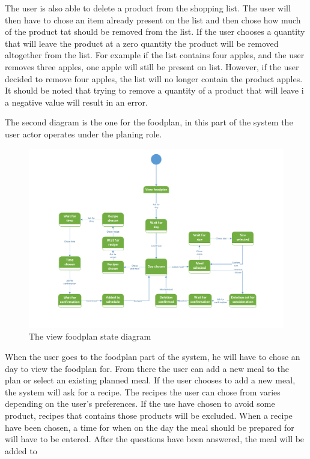 The user is also able to delete a product from the shopping list. The user will then have to chose an item already present on the list and then chose how much of the product tat should be removed from the list. If the user chooses a quantity that will leave the product at a zero quantity the product will be removed altogether from the list. For example if the list contains four apples, and the user removes three apples, one apple will still be present on list. However, if the user decided to remove four apples, the list will no longer contain the product apples. It should be noted that trying to remove a quantity of a product that will leave i a negative value will result in an error.


The second diagram is the one for the foodplan, in this part of the system the user actor operates under the planing role.

\begin{figure}[H]
	\centering
	\includegraphics[width=1.0\textwidth]{ApplicationDomain/spViewFoodPlan.pdf} 
	\caption{The view foodplan state diagram}
	\label{Foodplan_Figure}
\end{figure}
When the user goes to the foodplan part of the system, he will have to chose an day to view the foodplan for. From there the user can add a new meal to the plan or select an existing planned meal. If the user chooses to add a new meal, the system will ask for a recipe. The recipes the user can chose from varies depending on the user's preferences. If the use have chosen to avoid some product, recipes that contains those products will be excluded. When a recipe have been chosen, a time for when on the day the meal should be prepared for will have to be entered. After the questions have been answered, the meal will be added to 


